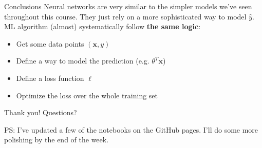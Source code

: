 \documentclass{beamer}
\newcommand{\1}[1]{\mathbbm{1}\left[#1\right]}
\newcommand{\yhat}{\hat{y}}
\newcommand{\bx}{\bm{x}}
\newcommand{\pv}{\pause\vfill}
\begin{document}
\begin{frame}{Conclusions}
Neural networks are very similar to the simpler models we've seen throughout this course. They just rely on a more sophisticated way to model $\yhat$.
\pv
ML algorithm (almost) systematically follow \textbf{the same logic}:
\begin{itemize}
	\item Get some data points $(\bx, y)$
	\item Define a way to model the prediction (e.g. $\theta^T \bx$)
	\item Define a loss function $\ell$
	\item Optimize the loss over the whole training set
\end{itemize}
\end{frame}

\begin{frame}
\begin{center}
\Huge{Thank you! Questions?}
\end{center}
\vfill
PS: I've updated a few of the notebooks on the GitHub pages. I'll do some more polishing by the end of the week.
\end{frame}
\end{document}
